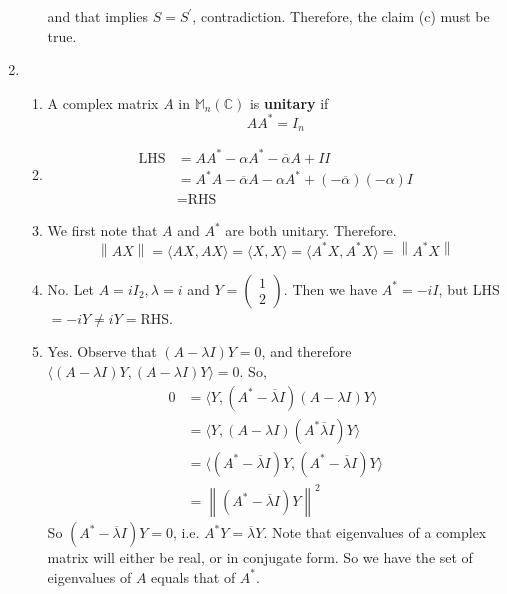\documentclass[12pt]{article}
\newcommand{\str}{^\ast}
\newcommand\norm[1]{\left\lVert#1\right\rVert}
\theoremstyle{definition}
\begin{document}
\begin{enumerate}
\begin{enumerate}
\[\]
and that implies $S=S^\prime$, contradiction. Therefore, the claim (c) must be true.
\end{enumerate}
\item\begin{enumerate}
\item   A complex matrix $A$ in $\mathbb{M}_n(\mathbb{C})$ is \textbf{unitary} if
\[
AA^\ast = I_n
\]
\item \begin{align*}
\text{LHS} &= AA\str -\alpha A\str -\overline{\alpha}A+II \\
&=A\str A - \overline{\alpha}A - \alpha A\str +(-\overline{\alpha})(-\alpha)I\\
&=\text{RHS}
\end{align*}
\item We first note that $A$ and $A^\ast$ are both unitary. Therefore.
\[
\norm{AX}=\langle AX,AX\rangle = \langle X,X\rangle = \langle A\str X, A\str X\rangle = \norm{A\str X}
\]
\item No. Let $A = iI_2, \lambda = i$ and $Y = \begin{pmatrix}1\\2\end{pmatrix}$. Then we have $A^\ast = -iI$, but LHS$=-iY\neq iY=$RHS.
\item Yes. Observe that $(A-\lambda I)Y = 0$, and therefore $\langle (A-\lambda I)Y, (A-\lambda I)Y \rangle = 0$. So,
\begin{align*}
0&=\langle Y,(A\str -\overline{\lambda} I)(A-\lambda I)Y\rangle\\
&=\langle Y, (A-\lambda I)(A\str \overline{\lambda}I)Y\rangle\\
&=\langle (A\str -\overline{\lambda}I)Y,(A\str -\overline{\lambda}I)Y\rangle\\
&=\norm{(A\str -\overline{\lambda}I)Y}^2
\end{align*}
So $(A\str- \overline{\lambda}I)Y = 0$, i.e. $A\str Y = \overline{\lambda}Y$. Note that eigenvalues of a complex matrix will either be real, or in conjugate form. So we have the set of eigenvalues of $A$ equals that of $A\str$.


\end{enumerate}
\end{enumerate}
\end{document}

